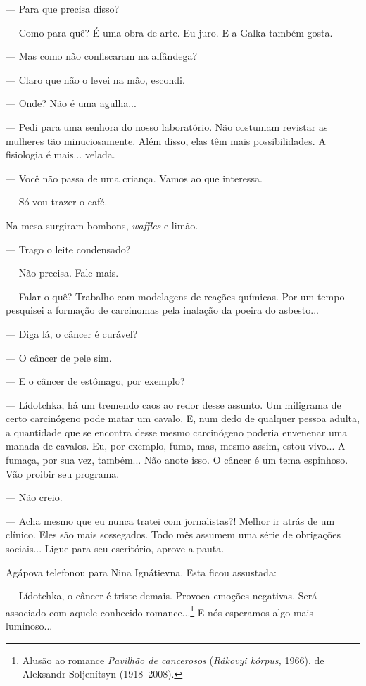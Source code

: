 --- Para que precisa disso?

--- Como para quê? É uma obra de arte. Eu juro. E a Galka também gosta.

--- Mas como não confiscaram na alfândega?

--- Claro que não o levei na mão, escondi.

--- Onde? Não é uma agulha...

--- Pedi para uma senhora do nosso laboratório. Não costumam revistar as
mulheres tão minuciosamente. Além disso, elas têm mais possibilidades. A
fisiologia é mais... velada.

--- Você não passa de uma criança. Vamos ao que interessa.

--- Só vou trazer o café.

Na mesa surgiram bombons, \emph{waffles} e limão.

--- Trago o leite condensado?

--- Não precisa. Fale mais.

--- Falar o quê? Trabalho com modelagens de reações químicas. Por um
tempo pesquisei a formação de carcinomas pela inalação da poeira do
asbesto...

--- Diga lá, o câncer é curável?

--- O câncer de pele sim.

--- E o câncer de estômago, por exemplo?

--- Lídotchka, há um tremendo caos ao redor desse assunto. Um miligrama
de certo carcinógeno pode matar um cavalo. E, num dedo de qualquer
pessoa adulta, a quantidade que se encontra desse mesmo carcinógeno
poderia envenenar uma manada de cavalos. Eu, por exemplo, fumo, mas,
mesmo assim, estou vivo... A fumaça, por sua vez, também... Não anote
isso. O câncer é um tema espinhoso. Vão proibir seu programa.

--- Não creio.

--- Acha mesmo que eu nunca tratei com jornalistas?! Melhor ir atrás de
um clínico. Eles são mais sossegados. Todo mês assumem uma série de
obrigações sociais... Ligue para seu escritório, aprove a pauta.

Agápova telefonou para Nina Ignátievna. Esta ficou assustada:

--- Lídotchka, o câncer é triste demais. Provoca emoções negativas. Será
associado com aquele conhecido romance...\footnote{Alusão ao romance
  \emph{Pavilhão de cancerosos} (\emph{Rákovyi kórpus,} 1966), de
  Aleksandr Soljenítsyn (1918--2008).} E nós esperamos algo mais
luminoso...

